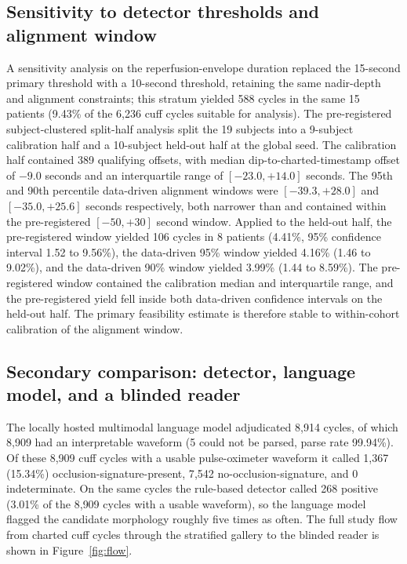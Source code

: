 \documentclass[twocolumn,letterpaper,10pt]{article}
\begin{document}
\subsection{Sensitivity to detector thresholds and alignment window}

A sensitivity analysis on the reperfusion-envelope duration replaced the 15-second primary threshold with a 10-second threshold, retaining the same nadir-depth and alignment constraints; this stratum yielded 588 cycles in the same 15 patients (9.43\% of the 6{,}236 cuff cycles suitable for analysis). The pre-registered subject-clustered split-half analysis split the 19 subjects into a 9-subject calibration half and a 10-subject held-out half at the global seed. The calibration half contained 389 qualifying offsets, with median dip-to-charted-timestamp offset of $-9.0$ seconds and an interquartile range of $[-23.0, +14.0]$ seconds. The 95th and 90th percentile data-driven alignment windows were $[-39.3, +28.0]$ and $[-35.0, +25.6]$ seconds respectively, both narrower than and contained within the pre-registered $[-50, +30]$ second window. Applied to the held-out half, the pre-registered window yielded 106 cycles in 8 patients (4.41\%, 95\% confidence interval 1.52 to 9.56\%), the data-driven 95\% window yielded 4.16\% (1.46 to 9.02\%), and the data-driven 90\% window yielded 3.99\% (1.44 to 8.59\%). The pre-registered window contained the calibration median and interquartile range, and the pre-registered yield fell inside both data-driven confidence intervals on the held-out half. The primary feasibility estimate is therefore stable to within-cohort calibration of the alignment window.

\subsection{Secondary comparison: detector, language model, and a blinded reader}

The locally hosted multimodal language model adjudicated 8{,}914 cycles, of which 8{,}909 had an interpretable waveform (5 could not be parsed, parse rate 99.94\%). Of these 8{,}909 cuff cycles with a usable pulse-oximeter waveform it called 1{,}367 (15.34\%) occlusion-signature-present, 7{,}542 no-occlusion-signature, and 0 indeterminate. On the same cycles the rule-based detector called 268 positive (3.01\% of the 8{,}909 cycles with a usable waveform), so the language model flagged the candidate morphology roughly five times as often. The full study flow from charted cuff cycles through the stratified gallery to the blinded reader is shown in Figure~\ref{fig:flow}.
\end{document}
